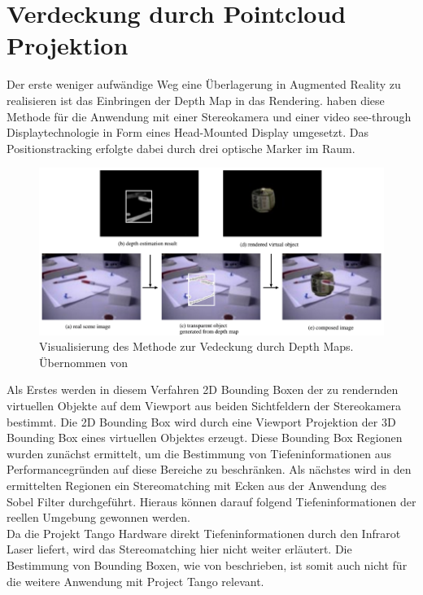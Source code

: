 \section{Verdeckung durch Pointcloud Projektion} \label{sec:pc-projection}

Der erste weniger aufwändige Weg eine Überlagerung in Augmented Reality zu realisieren ist das Einbringen der Depth Map in das Rendering. \citet{kanbara2000stereoscopic} haben diese Methode für die Anwendung mit einer Stereokamera und einer video see-through Displaytechnologie in Form eines Head-Mounted Display umgesetzt. Das Positionstracking erfolgte dabei durch drei optische Marker im Raum. \\

\begin{figure}[h]
  \centering
	\includegraphics[width=1.0\textwidth]{content/images/methods/stereo-depth-map.png} 
  \caption{Visualisierung des Methode zur Vedeckung durch Depth Maps. Übernommen von \citet{kanbara2000stereoscopic}}
  \label{fig:stereo-depth-map}
\end{figure}

Als Erstes werden in diesem Verfahren 2D Bounding Boxen der zu rendernden virtuellen Objekte auf dem Viewport aus beiden Sichtfeldern der Stereokamera bestimmt. Die 2D Bounding Box wird durch eine Viewport Projektion der 3D Bounding Box eines virtuellen Objektes erzeugt. Diese Bounding Box Regionen wurden zunächst ermittelt, um die Bestimmung von Tiefeninformationen aus Performancegründen auf diese Bereiche zu beschränken. Als nächstes wird in den ermittelten Regionen ein Stereomatching mit Ecken aus der Anwendung des Sobel Filter durchgeführt. Hieraus können darauf folgend Tiefeninformationen der reellen Umgebung gewonnen werden. \citep{kanbara2000stereoscopic} \\

Da die Projekt Tango Hardware direkt Tiefeninformationen durch den Infrarot Laser liefert, wird das Stereomatching hier nicht weiter erläutert. Die Bestimmung von Bounding Boxen, wie von \citet{kanbara2000stereoscopic} beschrieben, ist somit auch nicht für die weitere Anwendung mit Project Tango relevant.\\

